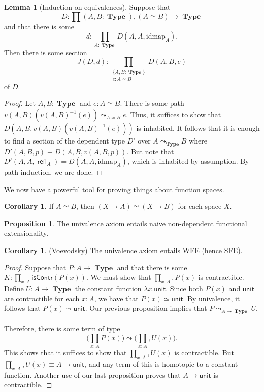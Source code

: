 \documentclass[10pt,letterpaper,cm]{nupset}
\theoremstyle{definition}
\theoremstyle{theorem}
\newtheorem{lemma}[definition]{Lemma}
\newtheorem{prop}[definition]{Proposition}
\newtheorem{corollary}[definition]{Corollary}
\theoremstyle{remark}
\newcommand{\1}{\mathbf{1}}
\newcommand{\0}{\vec 0}
\DeclareMathOperator{\refl}{\mathsf{refl}}
\DeclareMathOperator{\type}{\mathbf{Type}}
\begin{document}
\begin{lemma}[Induction on equivalences] 
Suppose that $$D: \prod(A, B : \type), (A \simeq B) \to \type$$ and that there is some $$d: \prod_{A: \type}D(A, A, \text{idmap}_A).$$ Then there is some section  $$J(D, d)  :  \prod_{\substack{\{A,B:\type\} \\ e:A\simeq B}} D(A,B,e) $$ of $D$. 
\end{lemma}
\begin{proof}
Let $A,B: \type$ and $e: A \simeq B$. There is some path $v(A,B)(v(A,B)^{-1}(e))\leadsto_{A\simeq B} e$. Thus, it suffices to show that $D(A, B, v(A,B)(v(A,B)^{-1}(e)))$ is inhabited. It follows that it is enough to find a section of the dependent type $D'$ over $A\leadsto_{\type} B$ where $D'(A, B, p) \equiv D(A, B, v(A, B, p))$. But note that $D'(A, A, \refl_A) = D(A, A, \text{idmap}_A)$, which is inhabited by assumption. By path induction, we are done.
\end{proof}

We now have a powerful tool for proving things about function spaces.

\begin{corollary}
If $A \simeq B$, then $(X \to A) \simeq (X \to B)$ for each space $X$.
\end{corollary}

\begin{prop}
The univalence axiom entails naive non-dependent functional extensionality. 
\end{prop}

\begin{corollary}{(Voevodsky)}
The univalence axiom entails WFE (hence SFE).
\end{corollary}
\begin{proof}
Suppose that $P: A \to \type$ and that there is some $K: \prod_{x:A}\mathsf{isContr}(P(x))$. We must show that $\prod_{x:A}, P(x)$ is contractible.  Define $U: A \to \type$ the constant function $\lambda x. \mathsf{unit}$. Since both $P(x)$ and $ \mathsf{unit}$ are contractible for each $x:A$, we have that $P(x) \simeq  \mathsf{unit}$. By univalence, it follows that $P(x) \leadsto  \mathsf{unit}$.  Our previous proposition implies that $P\leadsto_{A \to \type} U$.
\\ \\ Therefore, there is some term of type $$  \big (\prod_{x:A} P(x) \big ) \leadsto \big (\prod_{x:A}, U(x) \big )  .$$ This shows that it suffices to show that $\prod_{x:A}, U(x)$ is contractible.  But $\prod_{x:A}, U(x) \equiv A \to \mathsf{unit}$, and any term of this is homotopic to a constant function. Another use of our last proposition proves that $A \to \mathsf{unit}$ is contractible. 
\end{proof}
\end{document}
